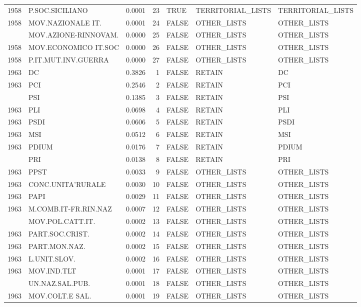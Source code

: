 \begin{longtable}[t]{rlrrlll}
1958 & P.SOC.SICILIANO & 0.0001 & 23 & TRUE & TERRITORIAL\_LISTS & TERRITORIAL\_LISTS\\
1958 & MOV.NAZIONALE IT. & 0.0001 & 24 & FALSE & OTHER\_LISTS & OTHER\_LISTS\\
\addlinespace
1958 & MOV.AZIONE-RINNOVAM. & 0.0000 & 25 & FALSE & OTHER\_LISTS & OTHER\_LISTS\\
1958 & MOV.ECONOMICO IT.SOC & 0.0000 & 26 & FALSE & OTHER\_LISTS & OTHER\_LISTS\\
1958 & P.IT.MUT.INV.GUERRA & 0.0000 & 27 & FALSE & OTHER\_LISTS & OTHER\_LISTS\\
1963 & DC & 0.3826 & 1 & FALSE & RETAIN & DC\\
1963 & PCI & 0.2546 & 2 & FALSE & RETAIN & PCI\\
\addlinespace
1963 & PSI & 0.1385 & 3 & FALSE & RETAIN & PSI\\
1963 & PLI & 0.0698 & 4 & FALSE & RETAIN & PLI\\
1963 & PSDI & 0.0606 & 5 & FALSE & RETAIN & PSDI\\
1963 & MSI & 0.0512 & 6 & FALSE & RETAIN & MSI\\
1963 & PDIUM & 0.0176 & 7 & FALSE & RETAIN & PDIUM\\
\addlinespace
1963 & PRI & 0.0138 & 8 & FALSE & RETAIN & PRI\\
1963 & PPST & 0.0033 & 9 & FALSE & OTHER\_LISTS & OTHER\_LISTS\\
1963 & CONC.UNITA'RURALE & 0.0030 & 10 & FALSE & OTHER\_LISTS & OTHER\_LISTS\\
1963 & PAPI & 0.0029 & 11 & FALSE & OTHER\_LISTS & OTHER\_LISTS\\
1963 & M.COMB.IT-FR.RIN.NAZ & 0.0007 & 12 & FALSE & OTHER\_LISTS & OTHER\_LISTS\\
\addlinespace
1963 & MOV.POL.CATT.IT. & 0.0002 & 13 & FALSE & OTHER\_LISTS & OTHER\_LISTS\\
1963 & PART.SOC.CRIST. & 0.0002 & 14 & FALSE & OTHER\_LISTS & OTHER\_LISTS\\
1963 & PART.MON.NAZ. & 0.0002 & 15 & FALSE & OTHER\_LISTS & OTHER\_LISTS\\
1963 & L.UNIT.SLOV. & 0.0002 & 16 & FALSE & OTHER\_LISTS & OTHER\_LISTS\\
1963 & MOV.IND.TLT & 0.0001 & 17 & FALSE & OTHER\_LISTS & OTHER\_LISTS\\
\addlinespace
1963 & UN.NAZ.SAL.PUB. & 0.0001 & 18 & FALSE & OTHER\_LISTS & OTHER\_LISTS\\
1963 & MOV.COLT.E SAL. & 0.0001 & 19 & FALSE & OTHER\_LISTS & OTHER\_LISTS\\

\end{longtable}
